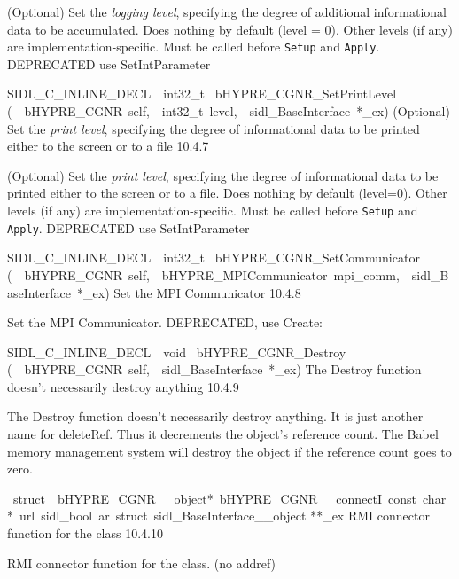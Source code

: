 \documentclass{article}
\begin{document}
\begin{cxxentry}
\begin{cxxentry}
\begin{cxxfunction}
\begin{cxxdoc}
(Optional) Set the {\it logging level}, specifying the degree
of additional informational data to be accumulated.  Does
nothing by default (level = 0).  Other levels (if any) are
implementation-specific.  Must be called before {\tt Setup}
and {\tt Apply}.
DEPRECATED   use SetIntParameter
\end{cxxdoc}
\end{cxxfunction}
\begin{cxxfunction}
{SIDL\_C\_INLINE\_DECL\ \ int32\_t\ }
        {bHYPRE\_CGNR\_SetPrintLevel}
        {(\ \ bHYPRE\_CGNR\ self,\ \ int32\_t\ level,\ \ sidl\_BaseInterface\ *\_ex)}
        {
(Optional) Set the {\it print level}, specifying the degree
of informational data to be printed either to the screen or
to a file}
        {10.4.7}
\begin{cxxdoc}

(Optional) Set the {\it print level}, specifying the degree
of informational data to be printed either to the screen or
to a file.  Does nothing by default (level=0).  Other levels
(if any) are implementation-specific.  Must be called before
{\tt Setup} and {\tt Apply}.
DEPRECATED   use SetIntParameter
\end{cxxdoc}
\end{cxxfunction}
\begin{cxxfunction}
{SIDL\_C\_INLINE\_DECL\ \ int32\_t\ }
        {bHYPRE\_CGNR\_SetCommunicator}
        {(\ \ bHYPRE\_CGNR\ self,\ \ bHYPRE\_MPICommunicator\ mpi\_comm,\ \ sidl\_BaseInterface\ *\_ex)}
        {
Set the MPI Communicator}
        {10.4.8}
\begin{cxxdoc}

Set the MPI Communicator.
DEPRECATED, use Create:
\end{cxxdoc}
\end{cxxfunction}
\begin{cxxfunction}
{SIDL\_C\_INLINE\_DECL\ \ void\ }
        {bHYPRE\_CGNR\_Destroy}
        {(\ \ bHYPRE\_CGNR\ self,\ \ sidl\_BaseInterface\ *\_ex)}
        {
The Destroy function doesn't necessarily destroy anything}
        {10.4.9}
\begin{cxxdoc}

The Destroy function doesn't necessarily destroy anything.
It is just another name for deleteRef.  Thus it decrements the
object's reference count.  The Babel memory management system will
destroy the object if the reference count goes to zero.
\end{cxxdoc}
\end{cxxfunction}
\begin{cxxvariable}
{\ struct\ \ bHYPRE\_CGNR\_\_object*\ bHYPRE\_CGNR\_\_connectI\ const\ char\ *\ url\ sidl\_bool\ ar\ struct\ sidl\_BaseInterface\_\_object}
        {**\_ex}
        {}
        {
RMI connector function for the class}
        {10.4.10}
\begin{cxxdoc}

RMI connector function for the class. (no addref)
\end{cxxdoc}
\end{cxxvariable}
\end{cxxentry}
\end{cxxentry}
\end{document}
